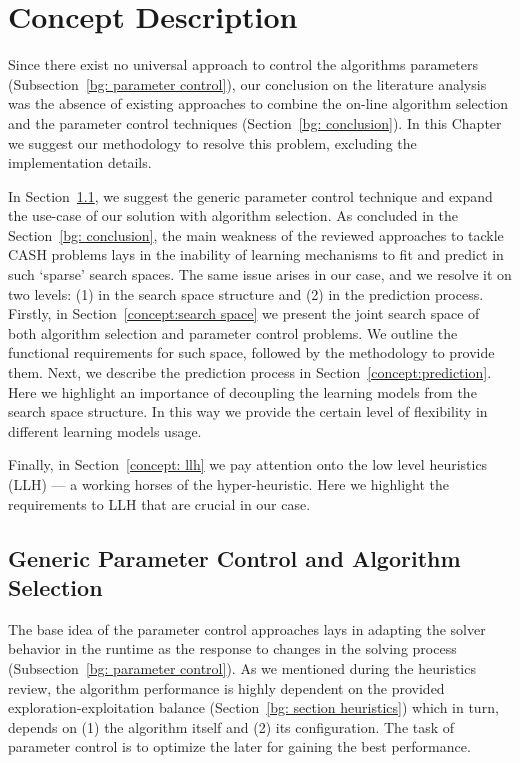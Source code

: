 \chapter{Concept Description}


Since there exist no universal approach to control the algorithms parameters (Subsection~\ref{bg: parameter control}), our conclusion on the literature analysis was the absence of existing approaches to combine the on-line algorithm selection and the parameter control techniques (Section~\ref{bg: conclusion}). In this Chapter we suggest our methodology to resolve this problem, excluding the implementation details.

In Section~\ref{concept:parameter control}, we suggest the generic parameter control technique and expand the use-case of our solution with algorithm selection. As concluded in the Section~\ref{bg: conclusion}, the main weakness of the reviewed approaches to tackle CASH problems lays in the inability of learning mechanisms to fit and predict in such `sparse' search spaces. The same issue arises in our case, and we resolve it on two levels: (1) in the search space structure and (2) in the prediction process. Firstly, in Section~\ref{concept:search space} we present the joint search space of both algorithm selection and parameter control problems. We outline the functional requirements for such space, followed by the methodology to provide them. Next, we describe the prediction process in Section~\ref{concept:prediction}. Here we highlight an importance of decoupling the learning models from the search space structure. In this way we provide the certain level of flexibility in different learning models usage.

Finally, in Section~\ref{concept: llh} we pay attention onto the low level heuristics (LLH) — a working horses of the hyper-heuristic. Here we highlight the requirements to LLH that are crucial in our case.


\section{Generic Parameter Control and Algorithm Selection}\label{concept:parameter control}
The base idea of the parameter control approaches lays in adapting the solver behavior in the runtime as the response to changes in the solving process (Subsection~\ref{bg: parameter control}). As we mentioned during the heuristics review, the algorithm performance is highly dependent on the provided exploration-exploitation balance (Section~\ref{bg: section heuristics}) which in turn, depends on (1) the algorithm itself and (2) its configuration. The task of parameter control is to optimize the later for gaining the best performance. 

